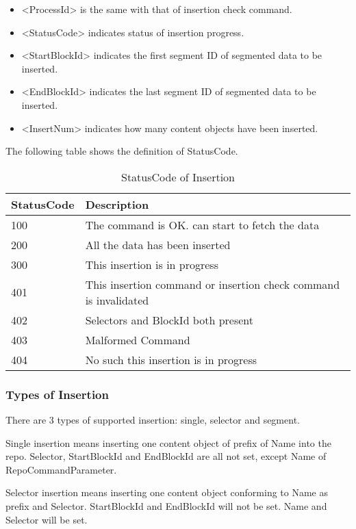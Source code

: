 \documentclass{acm_proc_article-sp}
\begin{document}
\begin{itemize}
\item <ProcessId> is the same with that of insertion check command.
\item <StatusCode> indicates status of insertion progress.
\item <StartBlockId> indicates the first segment ID of segmented data to be inserted.
\item <EndBlockId> indicates the last segment ID of segmented data to be inserted.
\item <InsertNum> indicates how many content objects have been inserted.
\end{itemize}

The following table shows the definition of StatusCode.

\begin{table}[!hbp]
\centering

\begin{tabular}{l l}

\hline
StatusCode & Description \\
\hline
100 & The command is OK. can start to fetch the data \\
200 & All the data has been inserted \\
300 & This insertion is in progress \\
401 & This insertion command or insertion check command is invalidated \\
402 & Selectors and BlockId both present\\
403 & Malformed Command \\
404 & No such this insertion is in progress \\
\hline

\end{tabular}
\caption{StatusCode of Insertion}
\end{table}

\subsubsection{Types of Insertion}
There are 3 types of supported insertion: single, selector and segment.

Single insertion means inserting one content object of prefix of Name into the repo. Selector, StartBlockId and EndBlockId are all not set, except Name of RepoCommandParameter.

Selector insertion means inserting one content object conforming to Name as prefix and Selector. StartBlockId and EndBlockId will not be set. Name and Selector will be set.
\end{document}
